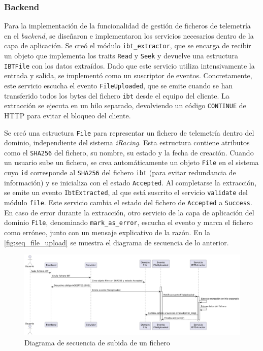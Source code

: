 \subsubsection*{Backend}

Para la implementación de la funcionalidad de gestión de ficheros de telemetría en el \textit{backend}, se diseñaron e implementaron los servicios necesarios dentro de la capa de aplicación. Se creó el módulo \texttt{ibt\_extractor}, que se encarga de recibir un objeto que implementa los traits \texttt{Read} y \texttt{Seek} y devuelve una estructura \texttt{IBTFile} con los datos extraídos. Dado que este servicio utiliza intensivamente la entrada y salida, se implementó como un suscriptor de eventos. Concretamente, este servicio escucha el evento \texttt{FileUploaded}, que se emite cuando se han transferido todos los bytes del fichero \texttt{ibt} desde el equipo del cliente. La extracción se ejecuta en un hilo separado, devolviendo un código \texttt{CONTINUE} de HTTP para evitar el bloqueo del cliente.

Se creó una estructura \texttt{File} para representar un fichero de telemetría dentro del dominio, independiente del sistema \textit{iRacing}. Esta estructura contiene atributos como el \texttt{SHA256} del fichero, su nombre, su estado y la fecha de creación. Cuando un usuario sube un fichero, se crea automáticamente un objeto \texttt{File} en el sistema cuyo \texttt{id} corresponde al \texttt{SHA256} del fichero \texttt{ibt} (para evitar redundancia de información) y se inicializa con el estado \texttt{Accepted}. Al completarse la extracción, se emite un evento \texttt{IbtExtracted}, al que está suscrito el servicio \texttt{validate} del módulo \texttt{file}. Este servicio cambia el estado del fichero de \texttt{Accepted} a \texttt{Success}. En caso de error durante la extracción, otro servicio de la capa de aplicación del dominio \texttt{File}, denominado \texttt{mark\_as\_error}, escucha el evento y marca el fichero como erróneo, junto con un mensaje explicativo de la razón. En la \autoref{fig:seq_file_upload} se muestra el diagrama de secuencia de lo anterior.

\begin{figure}[H]
\centering
\includegraphics[width=1\linewidth]{./figs/herramientas/desarrollo/seq_file_upload.png}
\caption[Diagrama de secuencia de subida de un fichero]{Diagrama de secuencia de subida de un fichero}
\label{fig:seq_file_upload}
\end{figure}

